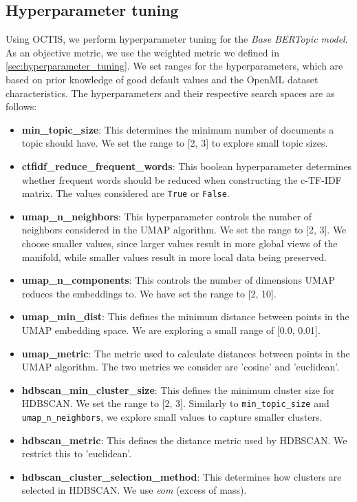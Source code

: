 \subsection{Hyperparameter tuning}
\label{sec:hyperparameter_tuning_results}
Using OCTIS, we perform hyperparameter tuning for the \textit{Base BERTopic model}. As an objective metric, we use the weighted metric we defined in \cref{sec:hyperparameter_tuning}. We set ranges for the hyperparameters, which are based on prior knowledge of good default values and the OpenML dataset characteristics. The hyperparameters and their respective search spaces are as follows:

\begin{itemize}
    \item \textbf{min\_topic\_size}: This determines the minimum number of documents a topic should have. We set the range to [2, 3] to explore small topic sizes.
    \item \textbf{ctfidf\_reduce\_frequent\_words}: This boolean hyperparameter determines whether frequent words should be reduced when constructing the c-TF-IDF matrix. The values considered are \texttt{True} or \texttt{False}.
    \item \textbf{umap\_n\_neighbors}: This hyperparameter controls the number of neighbors considered in the UMAP algorithm. We set the range to [2, 3]. We choose smaller values, since larger values result in more global views of the manifold, while smaller values result in more local data being preserved.
    \item \textbf{umap\_n\_components}: This controls the number of dimensions UMAP reduces the embeddings to. We have set the range to [2, 10].
    \item \textbf{umap\_min\_dist}: This defines the minimum distance between points in the UMAP embedding space. We are exploring a small range of [0.0, 0.01].
    \item \textbf{umap\_metric}: The metric used to calculate distances between points in the UMAP algorithm. The two metrics we consider are 'cosine' and 'euclidean'.
    \item \textbf{hdbscan\_min\_cluster\_size}: This defines the minimum cluster size for HDBSCAN. We set the range to [2, 3]. Similarly to \texttt{min\_topic\_size} and \texttt{umap\_n\_neighbors}, we explore small values to capture smaller clusters.
    \item \textbf{hdbscan\_metric}: This defines the distance metric used by HDBSCAN. We restrict this to 'euclidean'.
    \item \textbf{hdbscan\_cluster\_selection\_method}: This determines how clusters are selected in HDBSCAN. We use \textit{eom} (excess of mass).

\end{itemize}
